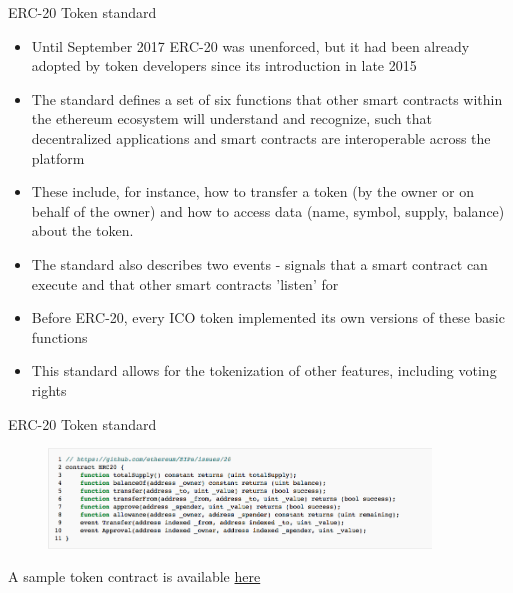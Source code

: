 \documentclass[10pt]{beamer}
\begin{document}
\begin{frame}{ERC-20 Token standard}
	\begin{small}
		\begin{itemize}
			\item Until September 2017 ERC-20 was unenforced, but it had been already adopted by token developers since its introduction in late 2015
			\item The standard defines a set of six functions that other smart contracts within the ethereum ecosystem will understand and recognize, such that decentralized applications and smart contracts are interoperable across the platform
			\item These include, for instance, how to transfer a token (by the owner or on behalf of the owner) and how to access data (name, symbol, supply, balance) about the token.
			\item The standard also describes two events - signals that a smart contract can execute and that other smart contracts 'listen' for
			\item Before ERC-20, every ICO token implemented its own versions of these basic functions
			\item This standard allows for the tokenization of other features, including voting rights
		\end{itemize}
	\end{small}
\end{frame}




\begin{frame}{ERC-20 Token standard}
	\begin{figure}[]
		\centering
		\includegraphics  [width=4in]{Images/erc20}
	\end{figure}
	\begin{scriptsize}
		A sample token contract is available \href{https://theethereum.wiki/w/index.php/ERC20_Token_Standard}{here}
	\end{scriptsize}
\end{frame}

\end{document}
